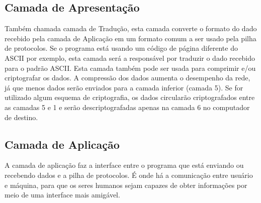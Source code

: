 
\subsection{Camada de Apresentação}

Também chamada camada de Tradução, esta camada converte o formato do dado recebido pela camada de Aplicação em um formato comum a ser usado pela pilha de protocolos. Se o programa está usando um código de página diferente do ASCII por exemplo, esta camada será a responsável por traduzir o dado recebido para o padrão ASCII. Esta camada também pode ser usada para comprimir e/ou criptografar os dados. A compressão dos dados aumenta o desempenho da rede, já que menos dados serão enviados para a camada inferior (camada 5). Se for utilizado algum esquema de criptografia, os dados circularão criptografados entre as camadas 5 e 1 e serão descriptografadas apenas na camada 6 no computador de destino.


\subsection{Camada de Aplicação}

A camada de aplicação faz a interface entre o programa que está enviando ou recebendo dados e a pilha de protocolos. É onde há a comunicação entre usuário e máquina, para que os seres humanos sejam capazes de obter informações por meio de uma interface mais amigável.

